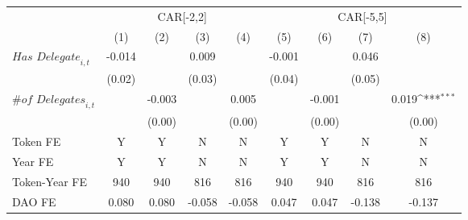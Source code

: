 {
\def\sym#1{\ifmmode^{#1}\else\(^{#1}\)\fi}
\begin{tabular}{l*{8}{c}}
\toprule
                    &\multicolumn{4}{c}{CAR[-2,2]}                                                          &\multicolumn{4}{c}{CAR[-5,5]}                                                          \\\cmidrule(lr){2-5}\cmidrule(lr){6-9}
                    &\multicolumn{1}{c}{(1)}         &\multicolumn{1}{c}{(2)}         &\multicolumn{1}{c}{(3)}         &\multicolumn{1}{c}{(4)}         &\multicolumn{1}{c}{(5)}         &\multicolumn{1}{c}{(6)}         &\multicolumn{1}{c}{(7)}         &\multicolumn{1}{c}{(8)}         \\
\midrule
$\textit{Has Delegate}_{i,t}$&      -0.014         &                     &       0.009         &                     &      -0.001         &                     &       0.046         &                     \\
                    &      (0.02)         &                     &      (0.03)         &                     &      (0.04)         &                     &      (0.05)         &                     \\
$\textit{\# of Delegates}_{i,t}$&                     &      -0.003         &                     &       0.005         &                     &      -0.001         &                     &       0.019\sym{***}\\
                    &                     &      (0.00)         &                     &      (0.00)         &                     &      (0.00)         &                     &      (0.00)         \\
\midrule
Token FE            &           Y         &           Y         &           N         &           N         &           Y         &           Y         &           N         &           N         \\
Year FE             &           Y         &           Y         &           N         &           N         &           Y         &           Y         &           N         &           N         \\
Token-Year FE       &         940         &         940         &         816         &         816         &         940         &         940         &         816         &         816         \\
DAO FE              &       0.080         &       0.080         &      -0.058         &      -0.058         &       0.047         &       0.047         &      -0.138         &      -0.137         \\
\bottomrule
\end{tabular}
}
